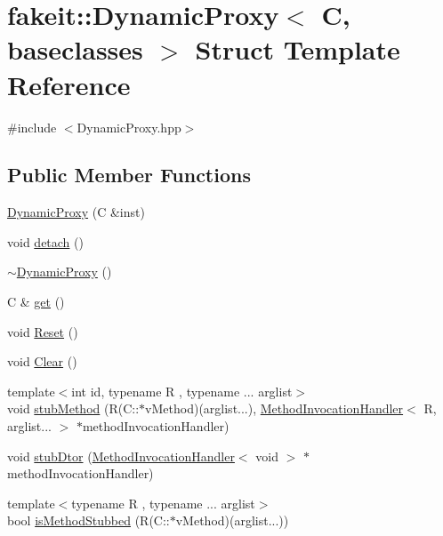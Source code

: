 \hypertarget{structfakeit_1_1DynamicProxy}{}\section{fakeit\+::Dynamic\+Proxy$<$ C, baseclasses $>$ Struct Template Reference}
\label{structfakeit_1_1DynamicProxy}


{\ttfamily \#include $<$Dynamic\+Proxy.\+hpp$>$}

\subsection*{Public Member Functions}
\begin{DoxyCompactItemize}
\item 
\mbox{\hyperlink{structfakeit_1_1DynamicProxy_a417e0221b7df3845b201a9e4a1f5028b}{Dynamic\+Proxy}} (C \&inst)
\item 
void \mbox{\hyperlink{structfakeit_1_1DynamicProxy_a154f25eeeb36c0635d9209dd5870943e}{detach}} ()
\item 
\mbox{\hyperlink{structfakeit_1_1DynamicProxy_a05e9d9c1bcaf4bcd14d1b6311e16c809}{$\sim$\+Dynamic\+Proxy}} ()
\item 
C \& \mbox{\hyperlink{structfakeit_1_1DynamicProxy_af8e4100c2d995a26bf3209e68c11d12a}{get}} ()
\item 
void \mbox{\hyperlink{structfakeit_1_1DynamicProxy_a8f00dd7c68a247f715ec3925f662de9f}{Reset}} ()
\item 
void \mbox{\hyperlink{structfakeit_1_1DynamicProxy_a995c7e3dd97dc7707f18774eb4554b45}{Clear}} ()
\item 
{\footnotesize template$<$int id, typename R , typename ... arglist$>$ }\\void \mbox{\hyperlink{structfakeit_1_1DynamicProxy_ab1a98295698cf6eed3ff04ed4b838e51}{stub\+Method}} (R(C\+::$\ast$v\+Method)(arglist...), \mbox{\hyperlink{structfakeit_1_1MethodInvocationHandler}{Method\+Invocation\+Handler}}$<$ R, arglist... $>$ $\ast$method\+Invocation\+Handler)
\item 
void \mbox{\hyperlink{structfakeit_1_1DynamicProxy_a8ab5aa831398c6ee27cbdb12ee1f15cf}{stub\+Dtor}} (\mbox{\hyperlink{structfakeit_1_1MethodInvocationHandler}{Method\+Invocation\+Handler}}$<$ void $>$ $\ast$method\+Invocation\+Handler)
\item 
{\footnotesize template$<$typename R , typename ... arglist$>$ }\\bool \mbox{\hyperlink{structfakeit_1_1DynamicProxy_aeccdd2a03ebbf8eecc3291ebe6ccbfc4}{is\+Method\+Stubbed}} (R(C\+::$\ast$v\+Method)(arglist...))

\end{DoxyCompactItemize}
